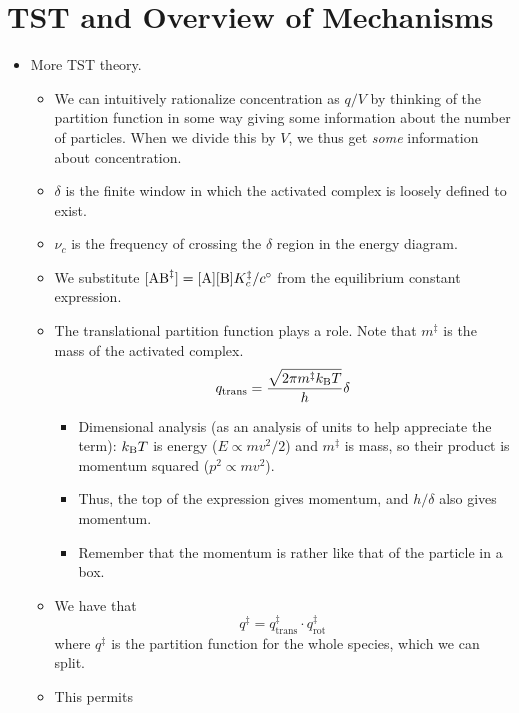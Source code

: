 \documentclass[../notes.tex]{subfiles}
\begin{document}
\section{TST and Overview of Mechanisms}
\begin{itemize}
    \item {}More TST theory.
    \begin{itemize}
        \item We can intuitively rationalize concentration as $q/V$ by thinking of the partition function in some way giving some information about the number of particles. When we divide this by $V$, we thus get \emph{some} information about concentration.
        \item $\delta$ is the finite window in which the activated complex is loosely defined to exist.
        \item $\nu_c$ is the frequency of crossing the $\delta$ region in the energy diagram.
        \item We substitute $[\ce{AB}^\ddagger]=[\ce{A}][\ce{B}]K_c^\ddagger/c^\circ$ from the equilibrium constant expression.
        \item The translational partition function plays a role. Note that $m^\ddagger$ is the mass of the activated complex.
        \begin{equation*}
            q_\text{trans} = \frac{\sqrt{2\pi m^\ddagger k_\text{B} T}}{h}\delta
        \end{equation*}
        \begin{itemize}
            \item Dimensional analysis (as an analysis of units to help appreciate the term): $k_\text{B} T$ is energy ($E\propto mv^2/2$) and $m^\ddagger$ is mass, so their product is momentum squared ($p^2\propto mv^2$).
            \item Thus, the top of the expression gives momentum, and $h/\delta$ also gives momentum.
            \item Remember that the momentum is rather like that of the particle in a box.
        \end{itemize}
        \item We have that
        \begin{equation*}
            q^\ddagger = q_\text{trans}^\ddagger\cdot q_\text{rot}^\ddagger
        \end{equation*}
        where $q^\ddagger$ is the partition function for the whole species, which we can split.
        \item This permits

\end{itemize}
\end{itemize}
\end{document}
